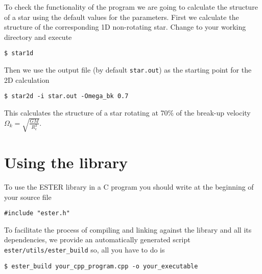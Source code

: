 To check the functionality of the program we are going to calculate the structure of a star using the default values for the parameters.
First we calculate the structure of the corresponding 1D non-rotating star. Change to your working directory and execute
\begin{verbatim}
$ star1d
\end{verbatim} 
Then we use the output file (by default {\tt star.out}) as the starting point for the 2D calculation
\begin{verbatim}
$ star2d -i star.out -Omega_bk 0.7
\end{verbatim} 
This calculates the structure of a star rotating at 70$\%$ of the break-up velocity $\Omega_k=\sqrt{\frac{GM}{R_e^3}}$.

\section{Using the library}

To use the ESTER library in a C program you should write at the beginning of your source file
\begin{verbatim}
#include "ester.h"
\end{verbatim}
To facilitate the process of compiling and linking against the library and all its dependencies, we provide an automatically generated
script {\tt ester/utils/ester\_build} so, all you have to do is
\begin{verbatim}
$ ester_build your_cpp_program.cpp -o your_executable
\end{verbatim} 





